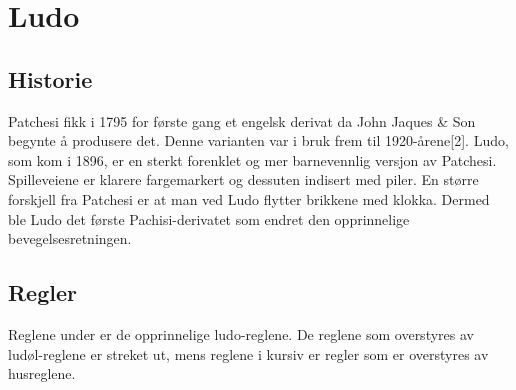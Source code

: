\documentclass[10pt,a4paper,norsk,openany]{book}
\begin{document}
\chapter{Ludo}

\section{Historie}

Patchesi fikk i 1795 for første gang et engelsk derivat da John Jaques \& Son
begynte å produsere det. Denne varianten var i bruk frem til 1920-årene[2].
Ludo, som kom i 1896, er en sterkt forenklet og mer barnevennlig versjon av
Patchesi. Spilleveiene er klarere fargemarkert og dessuten indisert med piler.
En større forskjell fra Patchesi er at man ved Ludo flytter brikkene med klokka.
Dermed ble Ludo det første Pachisi-derivatet som endret den opprinnelige
bevegelsesretningen.

\section{Regler} Reglene under er de opprinnelige ludo-reglene. De reglene
som overstyres av ludøl-reglene er streket ut, mens reglene i kursiv er regler
som er overstyres av husreglene.
\end{document}
